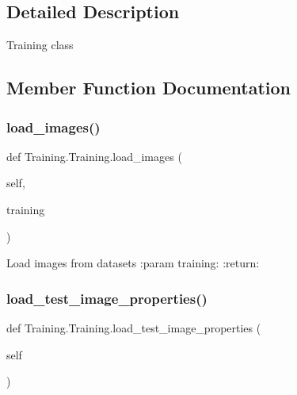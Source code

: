 \subsection{Detailed Description}
\begin{DoxyVerb}Training class
\end{DoxyVerb}
 

\subsection{Member Function Documentation}
\mbox{\label{class_training_1_1_training_a6df4e220dd5cbd4769a84852fc4e9d60}} 
\subsubsection{\texorpdfstring{load\+\_\+images()}{load\_images()}}
{\footnotesize\ttfamily def Training.\+Training.\+load\+\_\+images (\begin{DoxyParamCaption}\item[{}]{self,  }\item[{}]{training }\end{DoxyParamCaption})}

\begin{DoxyVerb}Load images from datasets
:param training:
:return:
\end{DoxyVerb}
 \mbox{\label{class_training_1_1_training_aa886794bd150b7a8894db32437893757}} 
\subsubsection{\texorpdfstring{load\+\_\+test\+\_\+image\+\_\+properties()}{load\_test\_image\_properties()}}
{\footnotesize\ttfamily def Training.\+Training.\+load\+\_\+test\+\_\+image\+\_\+properties (\begin{DoxyParamCaption}\item[{}]{self }\end{DoxyParamCaption})}

